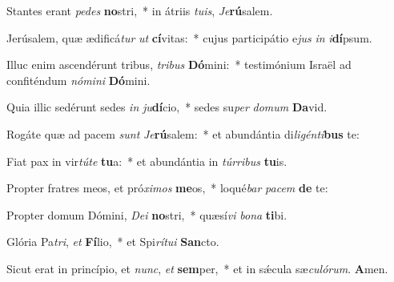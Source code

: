 \item Stantes erant \textit{pe}\textit{des} \textbf{no}stri,~* in átriis \textit{tu}\textit{is}, \textit{Je}\textbf{rú}salem.
\item Jerúsalem, quæ ædificá\textit{tur} \textit{ut} \textbf{cí}vitas:~* cujus participátio e\textit{jus} \textit{in} \textit{i}\textbf{dí}psum.
\item Illuc enim ascendérunt tribus, \textit{tri}\textit{bus} \textbf{Dó}mini:~* testimónium Israël ad confiténdum \textit{nó}\textit{mi}\textit{ni} \textbf{Dó}mini.
\item Quia illic sedérunt sedes \textit{in} \textit{ju}\textbf{dí}cio,~* sedes su\textit{per} \textit{do}\textit{mum} \textbf{Da}vid.
\item Rogáte quæ ad pacem \textit{sunt} \textit{Je}\textbf{rú}salem:~* et abundántia di\textit{li}\textit{gén}\textit{ti}\textbf{bus} te:
\item Fiat pax in vir\textit{tú}\textit{te} \textbf{tu}a:~* et abundántia in \textit{túr}\textit{ri}\textit{bus} \textbf{tu}is.
\item Propter fratres meos, et pró\textit{xi}\textit{mos} \textbf{me}os,~* loqué\textit{bar} \textit{pa}\textit{cem} \textbf{de} te:
\item Propter domum Dómini, \textit{De}\textit{i} \textbf{no}stri,~* quæsí\textit{vi} \textit{bo}\textit{na} \textbf{ti}bi.
\item Glória Pa\textit{tri}, \textit{et} \textbf{Fí}lio,~* et Spi\textit{rí}\textit{tu}\textit{i} \textbf{San}cto.
\item Sicut erat in princípio, et \textit{nunc}, \textit{et} \textbf{sem}per,~* et in sǽcula sæ\textit{cu}\textit{ló}\textit{rum}. \textbf{A}men.
